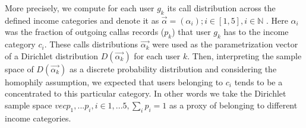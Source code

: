 More precisely, we compute for each user $g_k$ its call distribution across the defined income categories and denote it as $\vec{\alpha} =(\alpha_i); i \in [1,5], i\in \mathbb{N}$ . Here $\alpha_i$ was the fraction of outgoing callas records ($p_k$) that user $g_k$ has to the income category $c_i$. These calls distributions $\vec{\alpha_k}$ were used as the parametrization vector of a Dirichlet distribution $D(\vec{\alpha_k})$ for each user $k$. Then, interpreting the sample space of $D(\vec{\alpha_k})$ as a discrete probability distribution and considering the homophily assumption,  we expected that users belonging to $c_i$ tends to be a concentrated to this particular category. In other words we take the Dirichlet sample space $vec{p_1,...p_i}, i\in 1,...5, \sum_i{p_i}=1$ as a proxy of belonging to different income categories.\\